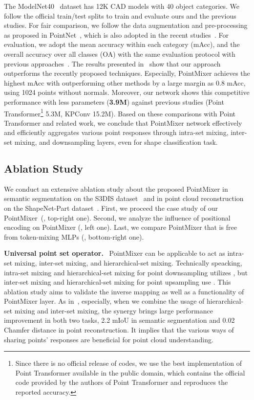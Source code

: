 %
 The ModelNet40~\cite{modelnet40} dataset has 12K CAD models with 40 object categories. We follow the official train/test splits to train and evaluate ours and the previous studies. 
For fair comparison, we follow the data augmentation and pre-processing as proposed in PointNet\plusplus~\cite{pointnet++}, which is also adopted in the recent studies~\cite{point-transformer,interpconv,kpconv,xu2021paconv}. For evaluation, we adopt the mean accuracy within each category (mAcc), and the overall accuracy over all classes (OA) with the same evaluation protocol with previous approaches~\cite{pointnet++,point-transformer,xu2021paconv}.
The results presented in~ show that our approach outperforms the recently proposed techniques.
Especially, PointMixer achieves the highest mAcc with outperforming other methods by a large margin as 0.8 mAcc, using 1024 points without normals. Moreover, our network shows this competitive performance with less parameters (\textbf{3.9M}) against previous studies (Point Transformer\footnote{Since there is no official release of codes, we use the best implementation of Point Transformer available in the public domain, which contains the official code provided by the authors of Point Transformer and reproduces the reported accuracy.} 5.3M, KPConv 15.2M).
Based on these comparisons with Point Transformer and related work, we conclude that PointMixer network effectively and efficiently aggregates various point responses through intra-set mixing, inter-set mixing, and downsampling layers, even for shape classification task.


%
 
\subsection{Ablation Study}
\label{subsec:Ablation Study}
We conduct an extensive ablation study about the proposed PointMixer in semantic segmentation on the S3DIS dataset~\cite{armeni_cvpr16} and in point cloud reconstruction on the ShapeNet-Part dataset~\cite{shapenet-part}. 
First, we proceed the case study of our PointMixer~(, top-right one). 
Second, we analyze the influence of positional encoding on PointMixer (, left one). Last, we compare PointMixer that is free from token-mixing MLPs (, bottom-right one).


\noindent \textbf{Universal point set operator.} \
PointMixer can be applicable to act as intra-set mixing, inter-set mixing, and hierarchical-set mixing. Technically speacking, intra-set mixing and hierarchical-set mixing for point downsampling utilizes , but inter-set mixing and hierarchical-set mixing for point upsampling use . This ablation study aims to validate the inverse mapping as well as a functionality of PointMixer layer. As in~, 
especially, when we combine the usage of hierarchical-set mixing and inter-set mixing, the synergy brings large performance improvement in both two tasks, 2.2 mIoU in semantic segmentation and 0.02 Chamfer distance in point reconstruction.
It implies that the various ways of sharing points' responses are beneficial for point cloud understanding.

